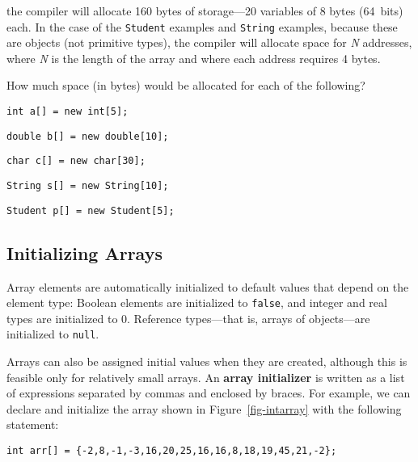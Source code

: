 \noindent the compiler will allocate 160 bytes of storage---20
variables of 8 bytes (64~bits) each.  In the case of the
  {\tt Student} examples and {\tt String}
examples, because these are objects (not primitive types), the
compiler will allocate space for {\it N} addresses, where {\it N} is
the length of the array and where each address requires 4 bytes.

\begin{SSTUDY}
\item  How much space  (in bytes) would be allocated
for each of the following?

\begin{EXRLL}
\item {\tt int a[] = new int[5];}    
\item {\tt double b[] = new double[10];}    
\item {\tt char c[] = new char[30];}        
\item {\tt String s[] = new String[10];}    
\item {\tt Student p[] = new Student[5];}  
\end{EXRLL}

\end{SSTUDY}

\subsection{Initializing Arrays}

\noindent Array elements are automatically initialized
to default values that depend on the element type:
Boolean elements are initialized to {\tt false}, and integer and real
types are initialized to 0. Reference types---that is, arrays of
objects---are initialized to {\tt null}.

Arrays can also be assigned initial values when they are created,
although this is feasible only for relatively small arrays.  An {\bf
array initializer} is written as a list of expressions separated by
commas and enclosed by braces.   For example, we can declare and
initialize the array shown in Figure~\ref{fig-intarray} with the
following statement:

\begin{jjjlisting}
\begin{lstlisting}
int arr[] = {-2,8,-1,-3,16,20,25,16,16,8,18,19,45,21,-2};
\end{lstlisting}
\end{jjjlisting}

